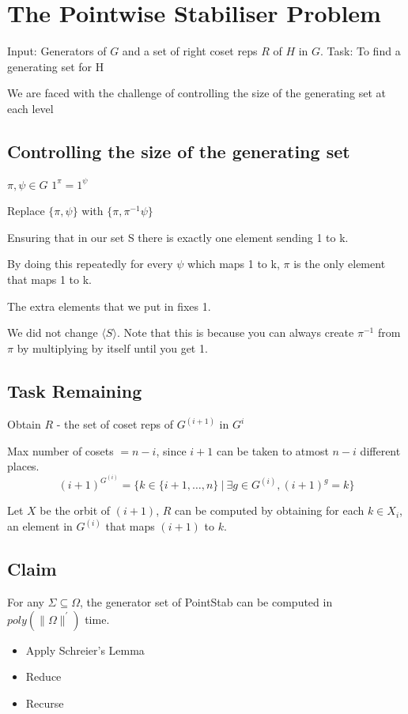
\section{The Pointwise Stabiliser Problem}
Input: Generators of $G$ and a set of right coset reps $R$ of $H$ in $G$.\newline
Task: To find a generating set for H\newline

We are faced with the challenge of controlling the size of the generating set
at each level

\subsection{Controlling the size of the generating set}
$\pi, \psi \in G$
$1^\pi = 1^\psi$

Replace $\{\pi,\psi\}$ with $\{\pi,\pi^{-1} \psi\}$

Ensuring that in our set S there is exactly one element sending 1 to k.

\begin{observation}
\item  By doing this repeatedly for every $\psi$ which maps 1 to k, $\pi$ is the only element that maps 1 to k.
\item  The extra elements that we put in fixes 1.
\item  We did not change $\langle S \rangle$. Note that this is because you can always
create $\pi^{-1}$  from $\pi$ by multiplying by itself until you get 1.
\end{observation}


\subsection{Task Remaining}
Obtain $R$ - the set of coset reps of $G^{(i+1)}$  in $G^i$

Max number of cosets $= n-i$, since $i+1$ can be taken to atmost $n-i$ 
different places.
\[ (i+1)^{G^{(i)}}=\{k\in\{i+1,\ldots , n\} ~|~ \exists g\in G^{(i)}, (i+1)^g = k\} \]

Let $X$ be the orbit of $(i+1)$, $R$ can be computed by obtaining for each $k\in X_i$, an element in $G^{(i)}$  that maps $(i+1)$ to $k$.

\subsection{Claim}
For any $\Sigma\subseteq\Omega$, the generator set of PointStab can be computed
in $poly(\|\Omega\|^{'} )$ time.
\begin{itemize}
\item Apply Schreier's Lemma
\item Reduce
\item Recurse
\end{itemize}
